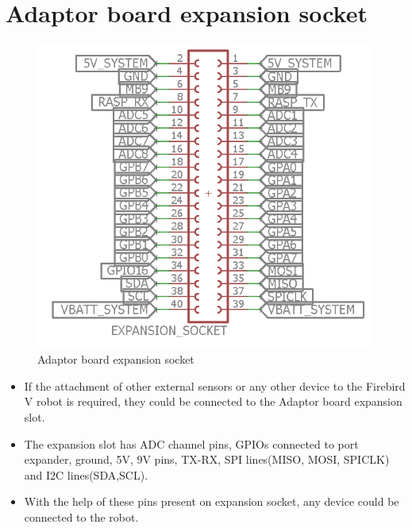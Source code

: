 \documentclass[a4paper,12pt,oneside]{book}
\begin{document}
\section{\textbf{Adaptor board expansion socket}}
\begin{figure}[h]
	\includegraphics[width=1\textwidth]{expansion}
	\caption{Adaptor board expansion socket}
\end{figure}
\begin{itemize}
	\item {If the attachment of other external sensors or any other device to the Firebird V robot is required, they could be connected to the Adaptor board expansion slot.}
	\item {The expansion slot has ADC channel pins, GPIOs connected to port expander, ground, 5V, 9V pins, TX-RX, SPI lines(MISO, MOSI, SPICLK) and I2C lines(SDA,SCL). }
	\item {With the help of these pins present on expansion socket, any device could be connected to the robot. }
\end{itemize}
\end{document}
